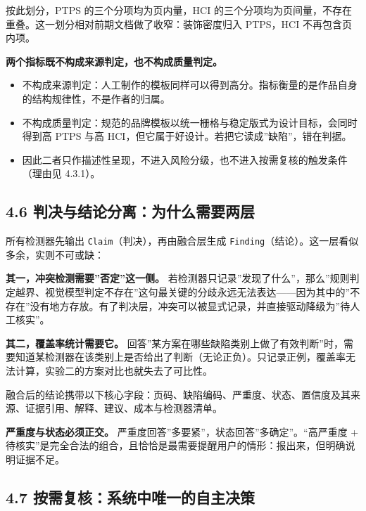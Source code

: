 \documentclass[
  11pt,
]{article}
\providecommand{\tightlist}{%
  \setlength{\itemsep}{0pt}\setlength{\parskip}{0pt}}
\begin{document}
按此划分，PTPS 的三个分项均为页内量，HCI
的三个分项均为页间量，不存在重叠。这一划分相对前期文档做了收窄：装饰密度归入
PTPS，HCI 不再包含页内项。

\textbf{两个指标既不构成来源判定，也不构成质量判定。}

\begin{itemize}
\tightlist
\item
  不构成来源判定：人工制作的模板同样可以得到高分。指标衡量的是作品自身的结构规律性，不是作者的归属。
\item
  不构成质量判定：规范的品牌模板以统一栅格与稳定版式为设计目标，会同时得到高
  PTPS 与高 HCI，但它属于好设计。若把它读成''缺陷''，错在判据。
\item
  因此二者只作描述性呈现，不进入风险分级，也不进入按需复核的触发条件（理由见
  4.3.1）。
\end{itemize}

\subsection{4.6
判决与结论分离：为什么需要两层}\label{ux5224ux51b3ux4e0eux7ed3ux8bbaux5206ux79bbux4e3aux4ec0ux4e48ux9700ux8981ux4e24ux5c42}

所有检测器先输出 \texttt{Claim}（判决），再由融合层生成
\texttt{Finding}（结论）。这一层看似多余，实则不可或缺：

\textbf{其一，冲突检测需要''否定''这一侧。}
若检测器只记录''发现了什么''，那么''规则判定越界、视觉模型判定不存在''这句最关键的分歧永远无法表达------因为其中的''不存在''没有地方存放。有了判决层，冲突可以被显式记录，并直接驱动降级为''待人工核实''。

\textbf{其二，覆盖率统计需要它。}
回答''某方案在哪些缺陷类别上做了有效判断''时，需要知道某检测器在该类别上是否给出了判断（无论正负）。只记录正例，覆盖率无法计算，实验二的方案对比也就失去了可比性。

融合后的结论携带以下核心字段：页码、缺陷编码、严重度、状态、置信度及其来源、证据引用、解释、建议、成本与检测器清单。

\textbf{严重度与状态必须正交。}
严重度回答''多要紧''，状态回答''多确定''。``高严重度 +
待核实''是完全合法的组合，且恰恰是最需要提醒用户的情形：报出来，但明确说明证据不足。

\subsection{4.7
按需复核：系统中唯一的自主决策}\label{ux6309ux9700ux590dux6838ux7cfbux7edfux4e2dux552fux4e00ux7684ux81eaux4e3bux51b3ux7b56}
\end{document}
